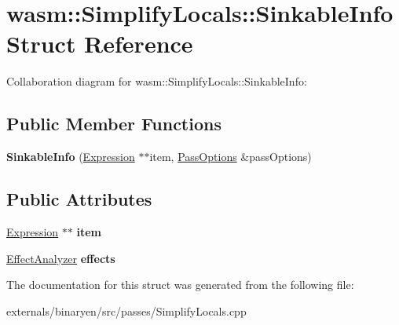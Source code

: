 \hypertarget{structwasm_1_1_simplify_locals_1_1_sinkable_info}{}\section{wasm\+:\+:Simplify\+Locals\+:\+:Sinkable\+Info Struct Reference}
\label{structwasm_1_1_simplify_locals_1_1_sinkable_info}


Collaboration diagram for wasm\+:\+:Simplify\+Locals\+:\+:Sinkable\+Info\+:
\subsection*{Public Member Functions}
\begin{DoxyCompactItemize}
\item 
\mbox{\label{structwasm_1_1_simplify_locals_1_1_sinkable_info_a7848ee4c5403f97a8ff8c927472202ee}} 
{\bfseries Sinkable\+Info} (\mbox{\hyperlink{classwasm_1_1_expression}{Expression}} $\ast$$\ast$item, \mbox{\hyperlink{structwasm_1_1_pass_options}{Pass\+Options}} \&pass\+Options)
\end{DoxyCompactItemize}
\subsection*{Public Attributes}
\begin{DoxyCompactItemize}
\item 
\mbox{\label{structwasm_1_1_simplify_locals_1_1_sinkable_info_a0e11c8b2a31a91f3b6118e8ad4a3467f}} 
\mbox{\hyperlink{classwasm_1_1_expression}{Expression}} $\ast$$\ast$ {\bfseries item}
\item 
\mbox{\label{structwasm_1_1_simplify_locals_1_1_sinkable_info_afa9c6311be13be31a664d5b4fcb77068}} 
\mbox{\hyperlink{structwasm_1_1_effect_analyzer}{Effect\+Analyzer}} {\bfseries effects}
\end{DoxyCompactItemize}


The documentation for this struct was generated from the following file\+:\begin{DoxyCompactItemize}
\item 
externals/binaryen/src/passes/Simplify\+Locals.\+cpp\end{DoxyCompactItemize}
